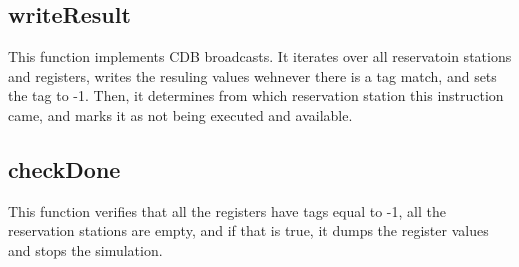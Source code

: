 \subsection{writeResult}

This function implements CDB broadcasts. It iterates over all reservatoin stations and registers, writes the resuling values wehnever there is a tag match, and sets the tag to -1. Then, it determines from which reservation station this instruction came, and marks it as not being executed and available.

\subsection{checkDone}

This function verifies that all the registers have tags equal to -1, all the reservation stations are empty, and if that is true, it dumps the register values and stops the simulation.